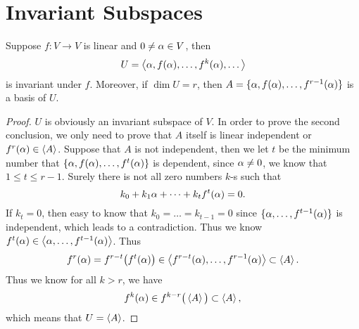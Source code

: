 \section{Invariant Subspaces}

\begin{pro}%
	Suppose $f\colon V\to V$ is linear and $0\neq \alpha\in V$, then 
	\[U=\left\langle \alpha,f(\alpha),\dots,f^k(\alpha),\dots\right\rangle\]
	 is invariant under $f$. Moreover, if $\dim U=r$, then $A=\{\alpha,f(\alpha),\dots,f^{r-1}(\alpha)\}$ is a basis of $U$.
\end{pro}
\begin{proof}
	$U$ is obviously an invariant subspace of $V$. In order to prove the second conclusion, we only need to prove that $A$ itself is linear independent or $f^r(\alpha)\in \left\langle A\right\rangle$. Suppose that $A$ is not independent, then we let $t$ be the minimum number that $\{\alpha,f(\alpha),\dots,f^t(\alpha)\}$ is dependent, since $\alpha\neq 0$, we know that $1\leq t\leq r-1$. Surely there is not all zero numbers $k$-s such that
	\[k_0+k_1\alpha+\dots+k_t f^t(\alpha)=0.\]
	If $k_t=0$, then easy to know that $k_0=\dots=k_{t-1}=0$ since $\{\alpha,\dots,f^{t-1}(\alpha)\}$ is independent, which leads to a contradiction. Thus we know $f^t(\alpha)\in \left\langle \alpha,\dots,f^{t-1}(\alpha)\right\rangle$. Thus
	\[f^r(\alpha)=f^{r-t}\big(f^t(\alpha)\big)\in \left\langle f^{r-t}(\alpha),\dots,f^{r-1}(\alpha)\right\rangle\subset \left\langle A\right\rangle.\]
	Thus we know for all $k>r$, we have 
	\[f^k(\alpha)\in f^{k-r}\big(\left\langle A\right\rangle\big)\subset \left\langle A\right\rangle,\]
	which means that $U=\left\langle A\right\rangle$.
\end{proof}

